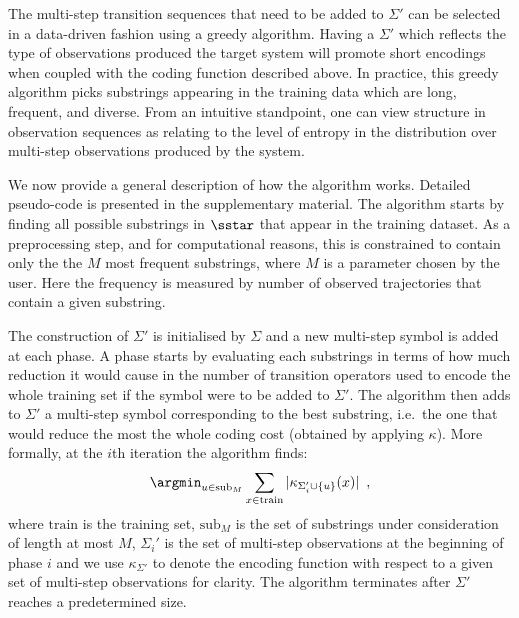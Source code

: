 The multi-step transition sequences that need to be added to $\Sigma'$ can be selected in a data-driven fashion using a
 greedy algorithm. Having a $\Sigma'$ which reflects the type of observations produced the target system will promote short encodings when coupled with the coding function described above. In practice, this greedy algorithm picks substrings appearing in the training data which are long, frequent, and diverse. From an intuitive standpoint, one can view structure in observation sequences as relating to the level of entropy in the distribution over multi-step observations produced by the system. 

We now provide a general description of how the algorithm works.  Detailed pseudo-code  is presented in the supplementary material. The algorithm starts by finding all possible substrings in $\sstar$ that appear in the training dataset. As a preprocessing step, and for computational reasons, this is constrained to contain only the the $M$ most frequent substrings, where $M$ is a parameter chosen by the user. Here the frequency is measured by number of observed trajectories that contain a given substring.

The construction of $\Sigma'$ is initialised by $\Sigma$ and a new multi-step symbol is added at each phase. A phase starts by evaluating each substrings in terms of how much reduction it would cause in  the number of transition operators used to encode the whole training set if the symbol were to be added to $\Sigma'$. The algorithm then adds to $\Sigma'$ a multi-step symbol corresponding to the best substring, i.e.\ the one that would reduce the most the whole coding cost (obtained by applying $\kappa$). More formally, at the $i$th iteration the algorithm finds:
\begin{equation*}
\argmin_{u \in \mathrm{sub}_M} \sum_{x \in \mathrm{train}} |\kappa_{\Sigma_i' \cup \{u\}}(x)| \enspace,
\end{equation*}
where $\mathrm{train}$ is the training set, $\mathrm{sub}_M$ is the set of substrings under consideration of length at most $M$, $\Sigma_i'$ is the set of multi-step observations at the beginning of phase $i$ and we use $\kappa_{\Sigma'}$ to denote the encoding function with respect to a given set of multi-step observations for clarity. The algorithm terminates after $\Sigma'$ reaches a predetermined size.

